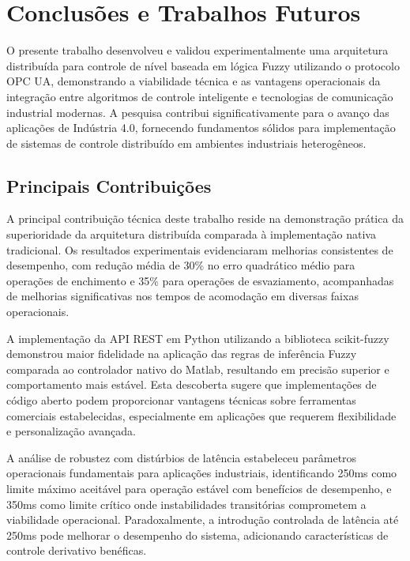 \chapter{Conclusões e Trabalhos Futuros}
\label{cap:conclusao}

O presente trabalho desenvolveu e validou experimentalmente uma arquitetura distribuída para controle de nível baseada em lógica Fuzzy utilizando o protocolo OPC UA, demonstrando a viabilidade técnica e as vantagens operacionais da integração entre algoritmos de controle inteligente e tecnologias de comunicação industrial modernas. A pesquisa contribui significativamente para o avanço das aplicações de Indústria 4.0, fornecendo fundamentos sólidos para implementação de sistemas de controle distribuído em ambientes industriais heterogêneos.

\section{Principais Contribuições}
\label{contribuicoes}

A principal contribuição técnica deste trabalho reside na demonstração prática da superioridade da arquitetura distribuída comparada à implementação nativa tradicional. Os resultados experimentais evidenciaram melhorias consistentes de desempenho, com redução média de 30\% no erro quadrático médio para operações de enchimento e 35\% para operações de esvaziamento, acompanhadas de melhorias significativas nos tempos de acomodação em diversas faixas operacionais.

A implementação da API REST em Python utilizando a biblioteca scikit-fuzzy demonstrou maior fidelidade na aplicação das regras de inferência Fuzzy comparada ao controlador nativo do Matlab, resultando em precisão superior e comportamento mais estável. Esta descoberta sugere que implementações de código aberto podem proporcionar vantagens técnicas sobre ferramentas comerciais estabelecidas, especialmente em aplicações que requerem flexibilidade e personalização avançada.

A análise de robustez com distúrbios de latência estabeleceu parâmetros operacionais fundamentais para aplicações industriais, identificando 250ms como limite máximo aceitável para operação estável com benefícios de desempenho, e 350ms como limite crítico onde instabilidades transitórias comprometem a viabilidade operacional. Paradoxalmente, a introdução controlada de latência até 250ms pode melhorar o desempenho do sistema, adicionando características de controle derivativo benéficas.

